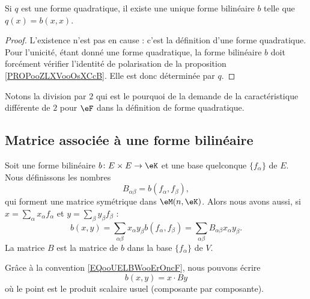 \begin{lemma}       \label{LEMooLKNTooSfLSHt}
    Si \( q\) est une forme quadratique, il existe une unique forme bilinéaire \( b\) telle que \( q(x)=b(x,x)\).
\end{lemma}

\begin{proof}
    L'existence n'est pas en cause : c'est la définition d'une forme quadratique. Pour l'unicité, étant donné une forme quadratique, la forme bilinéaire \( b\) doit forcément vérifier l'identité de polarisation de la proposition \ref{PROPooZLXVooOsXCcB}. Elle est donc déterminée par \( q\).
\end{proof}
Notons la division par \( 2\) qui est le pourquoi de la demande de la caractéristique différente de \( 2\) pour \( \eF\) dans la définition de forme quadratique.

\subsection{Matrice associée à une forme bilinéaire}

Soit une forme bilinéaire \( b\colon E\times E\to \eK\) et une base quelconque \( \{ f_{\alpha} \}\) de \( E\). Nous définissons les nombres
\begin{equation}    \label{EQooCUGFooRlKUtu}
    B_{\alpha\beta}=b(f_{\alpha},f_{\beta}),
\end{equation}
qui forment une matrice symétrique dans \( \eM(n,\eK)\). Alors nous avons aussi, si \( x=\sum_{\alpha}x_{\alpha}f_{\alpha}\) et \( y=\sum_{\beta}y_{\beta}f_{\beta}\) :
\begin{equation}        \label{EQooQFMWooVKVLMx}
    b(x,y)=\sum_{\alpha\beta}x_{\alpha}y_{\beta}b(f_{\alpha},f_{\beta})=\sum_{\alpha\beta}B_{\alpha\beta}x_{\alpha}y_{\beta}.
\end{equation}
La matrice \( B\) est la matrice de \( b\) dans la base \( \{ f_{\alpha} \}\) de \( V\).

Grâce à la convention \eqref{EQooUELBWooErOncF}, nous pouvons écrire
\begin{equation}
    b(x,y)=x\cdot By
\end{equation}
où le point est le produit scalaire usuel (composante par composante).

